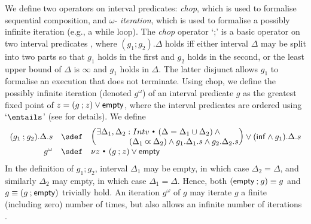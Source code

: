 \documentclass{article}
\newcommand{\Inf}{{\sf inf}}
\newcommand{\st}{~{\scriptscriptstyle ^\bullet}~}
\theoremstyle{plain}
\theoremstyle{definition}
\newcommand{\Empty}{{\sf empty}}
\def\adjoins{\mathbin{\varpropto}}
\def\ch{\mathbin{;}}
\begin{document}
We
define two operators on interval predicates: \emph{chop}, which is
used to formalise sequential composition, and $\omega$-{\em
  iteration}, which is used to formalise a possibly infinite iteration
(e.g., a while loop). The \emph{chop} operator `;' is a basic operator
on two interval predicates \cite{Mos00,DDH12,DH12MPC}, where $(g_1 \ch
g_2).\Delta$ holds iff either interval $\Delta$ may be split into two
parts so that $g_1$ holds in the first and $g_2$ holds in the second,
or the least upper bound of $\Delta$ is $\infty$ and $g_1$ holds in
$\Delta$. The latter disjunct allows $g_1$ to formalise an execution
that does not terminate. Using chop, we define the possibly infinite
iteration (denoted $g^\omega$) of an interval predicate $g$ as the
greatest fixed point of $z = (g \ch z) \lor \Empty$, where the
interval predicates are ordered using `$\entails$' (see \cite{DHMS12}
for details).  We define
$$\begin{array}{rcl}
  (g_1 \ch g_2).\Delta.s & \sdef &
  \begin{array}[t]{@{}l@{}}
    \left(\begin{array}[c]{@{}l@{}}
        \exists \Delta_1, \Delta_2 : Intv  \st
        (\Delta = \Delta_1
        \cup \Delta_2) \land \qquad {}\\
        \hfill (\Delta_1 \adjoins \Delta_2) 
        \land g_1.\Delta_1.s \land g_2.\Delta_2.s
      \end{array}\right) \lor 
    (\Inf \land g_1).\Delta.s
  \end{array}
  \\
  g^\omega & \sdef & \nu z \st (g \ch z) \lor
  \Empty 
\end{array}$$
\noindent
In the definition of $g_1 \ch g_2$, interval $\Delta_1$ may be empty,
in which case $\Delta_2 = \Delta$, and similarly $\Delta_2$ may empty,
in which case $\Delta_1 = \Delta$. Hence, both $(\Empty \ch g) \equiv
g$ and $g \equiv (g \ch \Empty)$ trivially hold. An iteration
$g^\omega$ of $g$ may iterate $g$ a finite (including zero) number of
times, but also allows an infinite number of iterations \cite{DHMS12}.
\end{document}
